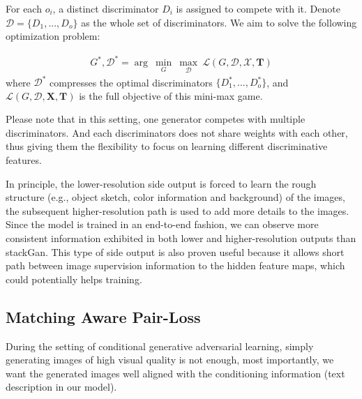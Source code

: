 \documentclass[10pt,twocolumn,letterpaper]{article}
\begin{document}
For each $o_i$, a distinct discriminator $D_i$ is assigned to compete with it. Denote $\mathcal{D}=\{D_1, ..., D_o\}$ as the whole set of discriminators.
We aim to solve the following optimization problem:

\begin{equation}
\label{equ:optim}
\begin{split}
  G^*, \mathcal{D}^* = \arg~\underset{G}{\min}\ \underset{\mathcal{D}}{\max}~ \mathcal{L}(G,\mathcal{D}, \mathcal{X}, \bm{T})
\end{split}
\end{equation}
where $\mathcal{D}^*$ compresses the optimal discriminators $\{D_1^*, ..., D_o^*\}$, and $ \mathcal{L}(G,\mathcal{D}, \bm{X}, \bm{T} )$ is the full objective of this mini-max game.

Please note that in this setting, one generator competes with multiple discriminators. And each discriminators does not share weights with each other, thus giving them the flexibility to focus on learning different discriminative features.
 

In principle, the lower-resolution side output is forced to learn the rough structure (e.g., object sketch, color information and background) of the images, the subsequent higher-resolution path is used to add more details to the images. 
Since the model is trained in an end-to-end fashion, we can observe more consistent information exhibited in both lower and higher-resolution outputs than stackGan\cite{han2017stackgan}. This type of side output is also proven useful because it allows short path between image supervision information to the hidden feature maps, which could potentially helps training.


\subsection{Matching Aware Pair-Loss}
During the setting of conditional generative adversarial learning, simply generating images of high visual quality is not enough, most importantly, we want the generated images well aligned with the conditioning information (text description in our model).     

%
\end{document}
